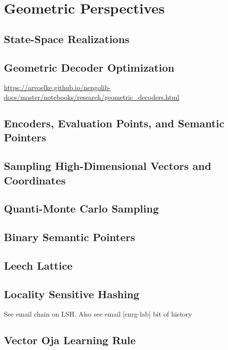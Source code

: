 \chapter{Geometric Perspectives}

\section{State-Space Realizations}

\section{Geometric Decoder Optimization}

\url{https://arvoelke.github.io/nengolib-docs/master/notebooks/research/geometric\_decoders.html}

\section{Encoders, Evaluation Points, and Semantic Pointers}

\section{Sampling High-Dimensional Vectors and Coordinates}

\section{Quanti-Monte Carlo Sampling}

\section{Binary Semantic Pointers}

\section{Leech Lattice}

\section{Locality Sensitive Hashing}

See email chain on LSH. Also see email [cnrg-lab] bit of history


\section{Vector Oja Learning Rule}
